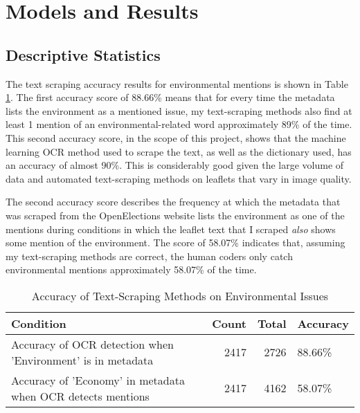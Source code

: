 \documentclass[12pt,letterpaper]{article}
\begin{document}
\newpage

\section{Models and Results}


\subsection{Descriptive Statistics}


The text scraping accuracy results for environmental mentions is shown in Table~ \ref{tab:envaccuracy}. The first accuracy score of 88.66\% means that for every time the metadata lists the environment as a mentioned issue, my text-scraping methods also find at least 1 mention of an environmental-related word approximately 89\% of the time. This second accuracy score, in the scope of this project, shows that the machine learning OCR method used to scrape the text, as well as the dictionary used, has an accuracy of almost 90\%. This is considerably good given the large volume of data and automated text-scraping methods on leaflets that vary in image quality.

The second accuracy score describes the frequency at which the metadata that was scraped from the OpenElections website lists the environment as one of the mentions during conditions in which the leaflet text that I scraped \textit{also} shows some mention of the environment. The score of 58.07\% indicates that, assuming my text-scraping methods are correct, the human coders only catch environmental mentions approximately 58.07\% of the time. 




\vspace{0.5cm}


\begin{table}[!htbp] 
	\centering 
	\captionsetup{justification=centering} %
	\caption{Accuracy of Text-Scraping Methods on Environmental Issues} 
	\label{tab:envaccuracy} 
	\begin{tabular}{lrrl}
		\toprule
		Condition & Count & Total & Accuracy \\
		\midrule
		Accuracy of OCR detection when 'Environment' is in metadata & 2417 & 2726 & 88.66\% \\
		Accuracy of 'Economy' in metadata when OCR detects mentions & 2417 & 4162 & 58.07\% \\
		\bottomrule
	\end{tabular}\\
\end{table}
\end{document}
